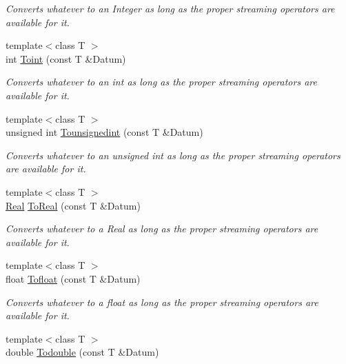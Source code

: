 \begin{DoxyCompactItemize}
\begin{DoxyCompactList}\small\item\em Converts whatever to an Integer as long as the proper streaming operators are available for it. \item\end{DoxyCompactList}\item 
{\footnotesize template$<$class T $>$ }\\int \hyperlink{namespacephys_af0a6dfb0aa9e9292b96a0273e1f49d3a}{Toint} (const T \&Datum)
\begin{DoxyCompactList}\small\item\em Converts whatever to an int as long as the proper streaming operators are available for it. \item\end{DoxyCompactList}\item 
{\footnotesize template$<$class T $>$ }\\unsigned int \hyperlink{namespacephys_a16ab66903d5e438a04f4e859c8aa47a7}{Tounsignedint} (const T \&Datum)
\begin{DoxyCompactList}\small\item\em Converts whatever to an unsigned int as long as the proper streaming operators are available for it. \item\end{DoxyCompactList}\item 
{\footnotesize template$<$class T $>$ }\\\hyperlink{namespacephys_af7eb897198d265b8e868f45240230d5f}{Real} \hyperlink{namespacephys_ac5ff9d58be770f2fe8c4928eb160c88a}{ToReal} (const T \&Datum)
\begin{DoxyCompactList}\small\item\em Converts whatever to a Real as long as the proper streaming operators are available for it. \item\end{DoxyCompactList}\item 
{\footnotesize template$<$class T $>$ }\\float \hyperlink{namespacephys_a8f892c12296033f70cc95c43f5c7e85c}{Tofloat} (const T \&Datum)
\begin{DoxyCompactList}\small\item\em Converts whatever to a float as long as the proper streaming operators are available for it. \item\end{DoxyCompactList}\item 
{\footnotesize template$<$class T $>$ }\\double \hyperlink{namespacephys_aa89192e0bb495fdf141649f5abd88963}{Todouble} (const T \&Datum)

\end{DoxyCompactItemize}
